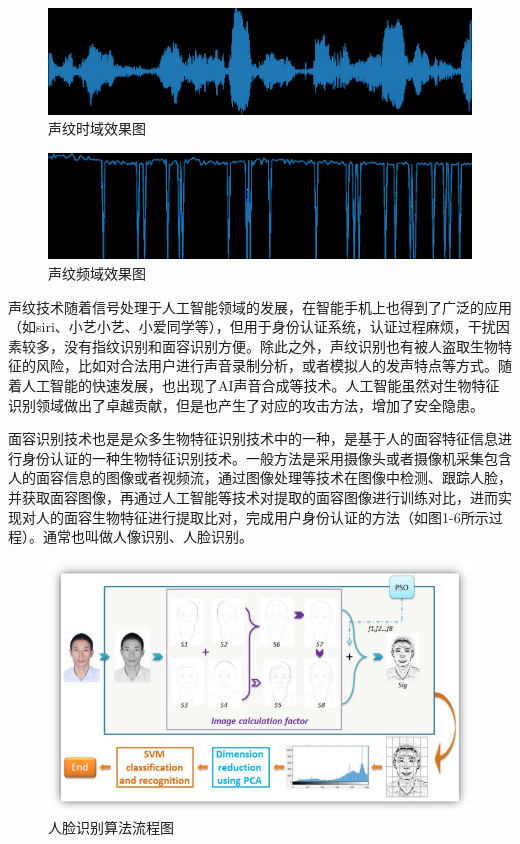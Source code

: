 \begin{figure}[htbp]
  \centering
  \includegraphics[width=0.5\linewidth]{images/shi.png}
  \caption{声纹时域效果图\cite{2022zhang}}\label{1-4} %
\end{figure}
\begin{figure}[htbp]
  \centering
  \includegraphics[width=0.5\linewidth]{images/pin.png}
  \caption{声纹频域效果图\cite{2022zhang}}\label{1-5} %
\end{figure}
\par
{声纹技术随着信号处理于人工智能领域的发展，在智能手机上也得到了广泛的应用（如siri、小艺小艺、小爱同学等），但用于身份认证系统，认证过程麻烦，干扰因素较多，没有指纹识别和面容识别方便。除此之外，声纹识别也有被人盗取生物特征的风险，比如对合法用户进行声音录制分析，或者模拟人的发声特点等方式。随着人工智能的快速发展，也出现了AI声音合成等技术。人工智能虽然对生物特征识别领域做出了卓越贡献，但是也产生了对应的攻击方法，增加了安全隐患。}
\par
{面容识别技术也是是众多生物特征识别技术中的一种，是基于人的面容特征信息进行身份认证的一种生物特征识别技术。一般方法是采用摄像头或者摄像机采集包含人的面容信息的图像或者视频流，通过图像处理等技术在图像中检测、跟踪人脸，并获取面容图像，再通过人工智能等技术对提取的面容图像进行训练对比，进而实现对人的面容生物特征进行提取比对，完成用户身份认证的方法（如图1-6所示过程）。通常也叫做人像识别、人脸识别。}
\begin{figure}[htbp]
  \centering
  \includegraphics[width=0.8\linewidth]{images/gr4.jpg}
  \caption{人脸识别算法流程图\cite{Song2018Image}}\label{1-6} %
\end{figure}
